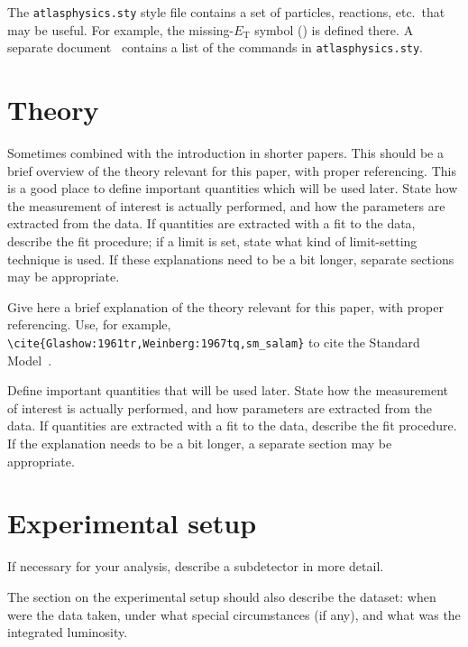 \documentclass[PAPER,UKenglish,texlive=2016]{\ATLASLATEXPATH atlasdoc}
\begin{document}
The \texttt{atlasphysics.sty} style file contains a set of particles,
reactions, etc.\ that may be useful. For example, the missing-$E_{\text{T}}$
symbol (\met{}) is defined there.
A separate document~\cite{atlas-physics}
contains a list of the commands in \texttt{atlasphysics.sty}.


\section{Theory}
\label{sec:theory}

Sometimes combined with the introduction in shorter papers.
This should be a brief overview of the theory relevant for this paper, with proper referencing.
This is a good place to define important quantities which will be used later.
State how the measurement of interest is actually performed, and how the parameters are extracted from the data.
If quantities are extracted with a fit to the data, describe the fit procedure;
if a limit is set, state what kind of limit-setting technique is used.
If these explanations need to be a bit longer, separate sections may be appropriate.

Give here a brief explanation of the theory relevant for this paper,
with proper referencing. Use, for example,
\verb|\cite{Glashow:1961tr,Weinberg:1967tq,sm_salam}| to cite the
Standard Model~\cite{Glashow:1961tr,Weinberg:1967tq,sm_salam}.

Define important quantities that will be used later.
State how the measurement of interest is actually performed, and how parameters are
extracted from the data.
If quantities are extracted with a fit to the data, describe the fit procedure.
If the explanation needs to be a bit longer, a separate section may be appropriate.


\section{Experimental setup}
\label{sec:atlas}

If necessary for your analysis, describe a subdetector in more detail.

The section on the experimental setup should also describe the dataset:
when were the data taken, under what special circumstances (if any),
and what was the integrated luminosity.
\end{document}
